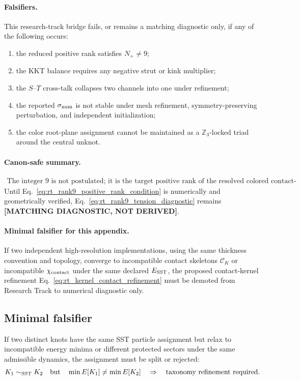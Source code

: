 \paragraph{Falsifiers.}
This research-track bridge fails, or remains a matching diagnostic only, if any
of the following occurs:
\begin{enumerate}
    \item the reduced positive rank satisfies \(N_+\ne9\);
    \item the KKT balance requires any negative strut or kink multiplier;
    \item the \(S\)--\(T\) cross-talk collapses two channels into one under refinement;
    \item the reported \(\sigma_{\rm num}\) is not stable under mesh refinement,
          symmetry-preserving perturbation, and independent initialization;
    \item the color root-plane assignment cannot be maintained as a
          \(\mathbb Z_3\)-locked triad around the central unknot.
\end{enumerate}

\paragraph{Canon-safe summary.}
\begin{align}
    \boxed{
    \text{The integer }9\text{ is not postulated; it is the target positive rank of the resolved colored contact-stress matrix.}
    }
    \label{eq:rt_rank9_canon_safe_summary}
\end{align}
Until Eq.~\eqref{eq:rt_rank9_positive_rank_condition} is numerically and
geometrically verified, Eq.~\eqref{eq:rt_rank9_tension_diagnostic} remains
\textbf{[MATCHING DIAGNOSTIC, NOT DERIVED]}.


\paragraph{Minimal falsifier for this appendix.}
If two independent high-resolution implementations, using the same thickness
convention and topology, converge to incompatible contact skeletons
$\mathcal C_K$ or incompatible $\chi_{\rm contact}$ under the same declared
$E_{\rm SST}$, the proposed contact-kernel refinement
Eq.~\eqref{eq:rt_kernel_contact_refinement} must be demoted from
Research Track to numerical diagnostic only.


\subsection{Minimal falsifier}
If two distinct knots have the same SST particle assignment but relax to incompatible energy minima or different protected sectors under the same admissible dynamics, the assignment must be split or rejected:
\begin{equation}
    K_1\sim_{\rm SST}K_2
    \quad\text{but}\quad
    \min E[K_1]\neq \min E[K_2]
    \quad\Rightarrow\quad
    \text{taxonomy refinement required.}
\end{equation}

